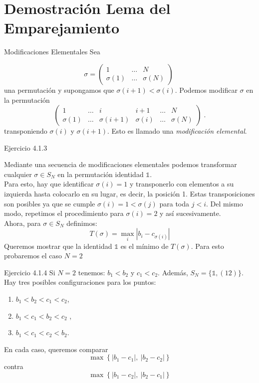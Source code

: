 \documentclass{beamer}
\newcounter{Ejercicio}
\begin{document}
\section{Demostración Lema del Emparejamiento}
\begin{frame}{Modificaciones Elementales}
	Sea
	
		\[
			\sigma =
			\begin{pmatrix}
			1 & \ldots & N \\
			\sigma(1) & \ldots & \sigma(N)
			\end{pmatrix} \;
		\]
	una permutación y supongamos que $\sigma (i+1) < \sigma (i)$.
 \pause
	Podemos modificar $\sigma$ en la permutación
		\[
		\begin{pmatrix}
		1		&\ldots&	 i & 			i+1 & 	\ldots &	N \\
		\sigma(1) & \ldots &\sigma(i+1)& \sigma(i)& \ldots & \sigma(N)
		\end{pmatrix} \;.
		\]
  \pause
	transponiendo $\sigma(i)$ y $\sigma(i+1)$. Esto es llamado una \emph{modificación elemental}.
\end{frame}
\begin{frame}{Ejercicio 4.1.3}

Mediante una secuencia de modificaciones elementales podemos transformar cualquier $\sigma \in S_N$ en la permutación identidad $\mathds{1}$.\\
\pause
Para esto, hay que identificar $\sigma(i)=1$ y transponerlo con elementos a su izquierda hasta colocarlo en su lugar, es decir, la posición 1. 
\pause
Estas transposiciones son posibles ya que se cumple $\sigma (i)= 1 < \sigma (j)$ para toda $j<i$.
\pause
Del mismo modo, repetimos el procedimiento para $\sigma(i)=2$ y así sucesivamente. \\
\pause
Ahora, para $\sigma \in S_N$ definimos:
\[T(\sigma) = \max_i |b_i - c_{\sigma(i)}|\]
\pause
Queremos mostrar que la identidad $\mathds{1}$ es el mínimo de $T(\sigma)$.
\pause
Para esto probaremos el caso $N=2$

 \end{frame}


\begin{frame}{Ejercicio 4.1.4}
Si $N=2$ tenemos: $b_1<b_2$ y $c_1<c_2$. Además, $S_N = \{\mathds{1}, (12)\}$.
\pause
Hay tres posibles configuraciones para los puntos:
\pause
\begin{enumerate}

		\item
			$b_1<b_2<c_1<c_2$,\pause
		\item
			$b_1<c_1<b_2<c_2$ ,\pause
		\item
			$b_1<c_1<c_2<b_2$.
	\end{enumerate}

\pause
En cada caso, queremos comparar 
\[\max \left\{ |b_1 - c_1|,\ |b_2 - c_2| \right\}\]
contra 
\[\max \left\{ |b_1 - c_2|,\ |b_2 - c_1| \right\}\]

\end{frame}
\end{document}
